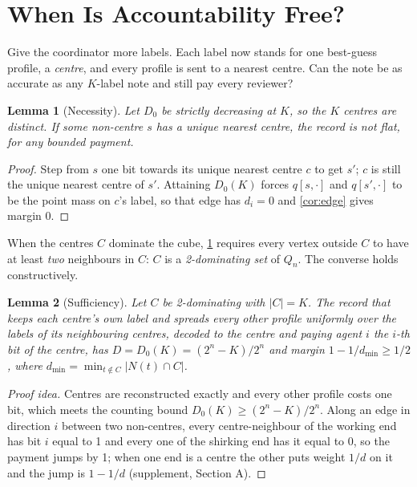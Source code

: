 \documentclass[sigconf,anonymous,acmthm=false]{acmart}
\theoremstyle{acmplain}
\newtheorem{lemma}{Lemma}
\theoremstyle{acmdefinition}
\newcommand{\dmin}{d_{\min}}
\begin{document}
\section{When Is Accountability Free?}\label{sec:flat}

\begin{story}
Give the coordinator more labels. Each label now stands for one best-guess profile, a
\emph{centre}, and every profile is sent to a nearest centre. Can the note be as accurate as
any $K$-label note and still pay every reviewer?
\end{story}

\begin{lemma}[Necessity]\label{lem:nec}
Let $D_0$ be strictly decreasing at $K$, so the $K$ centres are distinct. If some
non-centre $s$ has a unique nearest centre, the record is not flat, for any bounded payment.
\end{lemma}
\begin{proof}
Step from $s$ one bit towards its unique nearest centre $c$ to get $s'$; $c$ is still the
unique nearest centre of $s'$. Attaining $D_0(K)$ forces $q[s,\cdot]$ and $q[s',\cdot]$ to
be the point mass on $c$'s label, so that edge has $d_i=0$ and \cref{cor:edge} gives margin 0.
\end{proof}

When the centres $C$ dominate the cube, \cref{lem:nec} requires every vertex outside $C$
to have at least \emph{two} neighbours in $C$: $C$ is a \emph{2-dominating set} of $Q_n$.
The converse holds constructively.

\begin{lemma}[Sufficiency]\label{lem:suff}
Let $C$ be 2-dominating with $|C|=K$. The record that keeps each centre's own label and
spreads every other profile uniformly over the labels of its neighbouring centres, decoded
to the centre and paying agent $i$ the $i$-th bit of the centre, has $D=D_0(K)=(2^n-K)/2^n$
and margin $1-1/\dmin\ge1/2$, where $\dmin=\min_{t\notin C}|N(t)\cap C|$.
\end{lemma}

\begin{proof}[Proof idea]
Centres are reconstructed exactly and every other profile costs one bit, which meets the
counting bound $D_0(K)\ge(2^n-K)/2^n$. Along an edge in direction $i$ between two
non-centres, every centre-neighbour of the working end has bit $i$ equal to 1 and every one
of the shirking end has it equal to 0, so the payment jumps by 1; when one end is a centre
the other puts weight $1/d$ on it and the jump is $1-1/d$ (supplement, Section A).
\end{proof}
\end{document}

